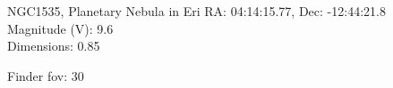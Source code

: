 \begin{block}{NGC1535, Planetary Nebula in Eri}
    RA: 04:14:15.77, Dec: -12:44:21.8 \\ 
    Magnitude (V): 9.6 \\ 
    Dimensions: 0.85 

    Finder fov: 30 
\end{block}